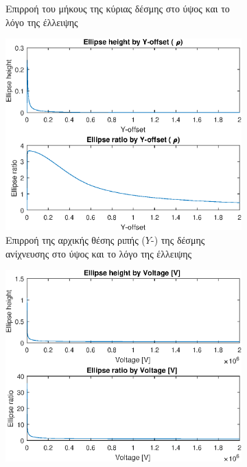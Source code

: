\begin{figure}[tph]
\begin{subfigure}{0.47\textwidth}
		\centering
		\caption{Επιρροή του μήκους της κύριας δέσμης στο ύψος και το λόγο της έλλειψης}
		\label{fig:EBS-variables-length}
	\end{subfigure}
	\par\bigskip
	\begin{subfigure}{0.47\textwidth}
		\includegraphics[width=\linewidth]{figures/MATLAB-variable-analysis/EBS-variables-rho}
		\centering
		\caption[Επιρροή της αρχικής θέσης ριπής της δέσμης ανίχνευσης στην ύψος και το λόγο της έλλειψης]{Επιρροή της αρχικής θέσης ριπής ($Y$-) της δέσμης ανίχνευσης στο ύψος και το λόγο της έλλειψης}
		\label{fig:EBS-variables-rho}
	\end{subfigure}
	\hfill
	\begin{subfigure}{0.47\textwidth}
		\includegraphics[width=\linewidth]{figures/MATLAB-variable-analysis/EBS-variables-voltage-linear}

\end{subfigure}
\end{figure}
